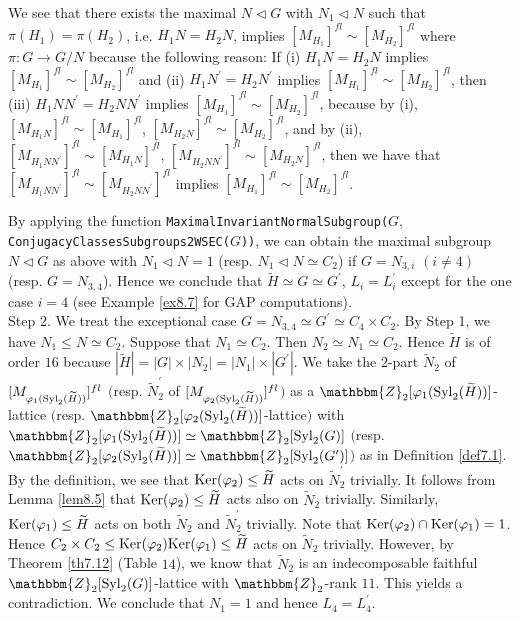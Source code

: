 \documentclass{amsart}
\theoremstyle{plain}
\theoremstyle{definition}
\theoremstyle{remark}
\newcommand{\bZ}{\mathbbm{Z}}\newcommand{\bQ}{\mathbbm{Q}}
\newcommand{\Syl}{{\rm Syl}}
\newcounter{sub}\def\tr{\mbox{tr }}
\begin{document}
{We see that there exists the maximal $N\lhd G$ with $N_1\lhd N$ such that 
$\pi(H_1)=\pi(H_2)$, i.e. $H_1N=H_2N$,  
implies $[M_{H_1}]^{fl}\sim [M_{H_2}]^{fl}$ 
where $\pi: G\to G/N$ because the following reason: 
If (i) $H_1N=H_2N$ implies $[M_{H_1}]^{fl}\sim [M_{H_2}]^{fl}$ and 
(ii) $H_1N^\prime=H_2N^\prime$ implies $[M_{H_1}]^{fl}\sim [M_{H_2}]^{fl}$, 
then (iii) $H_1NN^\prime=H_2NN^\prime$ implies $[M_{H_1}]^{fl}\sim [M_{H_2}]^{fl}$, 
because  
by (i), 
$[M_{H_1N}]^{fl}\sim [M_{H_1}]^{fl}$, 
$[M_{H_2N}]^{fl}\sim [M_{H_2}]^{fl}$, 
and by (ii), 
$[M_{H_1NN^\prime}]^{fl}\sim [M_{H_1N}]^{fl}$, 
$[M_{H_2NN^\prime}]^{fl}\sim [M_{H_2N}]^{fl}$, 
then we have that 
$[M_{H_1NN^\prime}]^{fl}\sim [M_{H_2NN^\prime}]^{fl}$ implies %
$[M_{H_1}]^{fl}\sim [M_{H_2}]^{fl}$. 

By applying the function 
{\tt MaximalInvariantNormalSubgroup(}$G$,
{\tt ConjugacyClassesSubgroups2WSEC(}$G${\tt ))}, 
we can obtain the maximal subgroup $N\lhd G$ as above with 
$N_1\lhd N=1$ (resp. $N_1\lhd N\simeq C_2$) 
if $G=N_{3,i}$ $(i\neq 4)$ (resp. $G=N_{3,4}$). 
Hence we conclude that $\widetilde{H}\simeq G\simeq G^\prime$, 
$L_i=L^\prime_i$ except for the one case $i=4$ 
(see Example \ref{ex8.7} for GAP computations).\\ 

Step 2. 
We treat the exceptional case $G=N_{3,4}\simeq G^\prime\simeq C_4\times C_2$. 
By Step 1, we have $N_1\leq N\simeq C_2$. 
Suppose that $N_1\simeq C_2$. 
Then $N_2\simeq N_1\simeq C_2$. 
Hence $\widetilde{H}$ is of order $16$ because 
$|\widetilde{H}|=|G|\times |N_2|=|N_1|\times |G^\prime|$. 
We take the $2$-part $\widetilde{N}_2$ of 
$[M_{\varphi_1(\Syl_2(\widetilde{H}))}]^{fl}$ 
$($resp. $\widetilde{N}^\prime_2$ of 
$[M_{\varphi_2(\Syl_2(\widetilde{H}))}]^{fl}$$)$ 
as a $\bZ_2[\varphi_1(\Syl_2(\widetilde{H}))]$-lattice 
$($resp. $\bZ_2[\varphi_2(\Syl_2(\widetilde{H}))]$-lattice$)$ 
with $\bZ_2[\varphi_1(\Syl_2(\widetilde{H}))]\simeq \bZ_2[\Syl_2(G)]$ 
$($resp. 
$\bZ_2[\varphi_2(\Syl_2(\widetilde{H}))]\simeq \bZ_2[\Syl_2(G^\prime)]$$)$ 
as in Definition \ref{def7.1}. 
%
By the definition, 
we see that 
${\rm Ker}(\varphi_2)\leq \widetilde{H}$ acts on 
$\widetilde{N}^\prime_2$ trivially. 
It follows from Lemma \ref{lem8.5} that 
${\rm Ker}(\varphi_2)\leq \widetilde{H}$ acts also on 
$\widetilde{N}_2$ trivially. 
Similarly, ${\rm Ker}(\varphi_1)\leq \widetilde{H}$ 
acts on both $\widetilde{N}_2$ and $\widetilde{N}^\prime_2$ trivially. 
Note that ${\rm Ker}(\varphi_2)\cap {\rm Ker}(\varphi_1)=1$. 
Hence $C_2\times C_2\leq 
{\rm Ker}(\varphi_2){\rm Ker}(\varphi_1)\leq\widetilde{H}$ 
acts on $\widetilde{N}_2$ trivially. 
However, by Theorem \ref{th7.12} (Table $14$), 
we know that $\widetilde{N}_2$ is an indecomposable 
faithful $\bZ_2[\Syl_2(G)]$-lattice with $\bZ_2$-rank $11$. 
This yields a contradiction. 
We conclude that $N_1=1$ and hence $L_4=L^\prime_4$.\\

}
\end{document}
